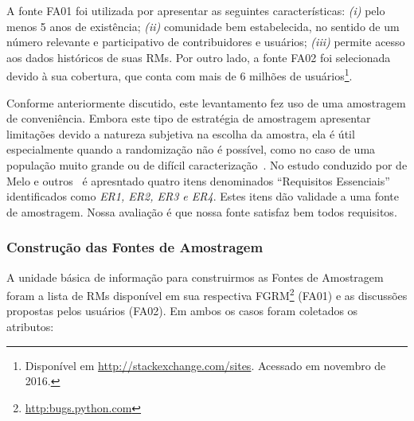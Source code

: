 A fonte FA01 foi utilizada por apresentar as seguintes características:
\textit{(i)} pelo menos 5 anos de existência; \textit{(ii)} comunidade bem
estabelecida, no sentido de um número relevante e participativo de
contribuidores e usuários; \textit{(iii)} permite acesso aos dados históricos de
suas RMs. Por outro lado, a fonte FA02 foi selecionada devido à sua cobertura,
que conta com mais de 6 milhões de usuários\footnote{Disponível em
    \url{http://stackexchange.com/sites}. Acessado em novembro de 2016.}.

Conforme anteriormente discutido, este levantamento fez uso de uma amostragem de
conveniência. Embora este tipo de estratégia de amostragem apresentar limitações
devido a natureza subjetiva na escolha da amostra, ela é útil especialmente
quando a randomização não é possível, como no caso de uma população muito grande
ou de difícil caracterização~\cite{boxill1997introduction}. No estudo conduzido
por de Melo e outros~\cite{de2014towards} é apresntado quatro itens denominados
``Requisitos Essenciais'' identificados como \textit{ER1, ER2, ER3 e ER4}. Estes
itens dão validade a uma fonte de amostragem. Nossa avaliação é que nossa fonte
satisfaz bem todos requisitos.



\subsubsection{Construção das Fontes de Amostragem}
\label{subsubsec:construcao_fonte_amostragem}

A unidade básica de informação para construirmos as Fontes de Amostragem foram a
lista de RMs disponível em sua respectiva
FGRM\footnote{\url{http:bugs.python.com}} (FA01) e as discussões propostas pelos
usuários (FA02). Em ambos os casos foram coletados os atributos:

